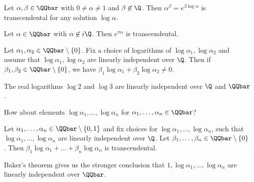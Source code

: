 \begin{thmn} 
	Let \( \alpha, \beta \in \QQbar \) with \( 0 \neq \alpha \neq 1 \) and \( \beta \not\in \Q \).
	Then \( \alpha^\beta = e^{\beta \log \alpha} \) is transcendental for any solution \( \log \alpha \).
\end{thmn}

\begin{cor}
	Let \( \alpha \in \QQbar \) with \( \alpha \not\in i\Q \).
	Then \( e^{\pi\alpha} \) is transcendental.
\end{cor}

\begin{cor}
	Let \( \alpha_1, \alpha_2 \in \QQbar \setminus \{0\} \).
	Fix a choice of logarithms of \( \log \alpha_1, \log\alpha_2 \) and assume that \( \log \alpha_1, \log\alpha_2 \) are linearly independent over \( \Q \).
	Then if \( \beta_1, \beta_2 \in \QQbar \setminus \{0\} \), we have \( \beta_1 \log\alpha_1 + \beta_2 \log\alpha_2 \neq 0 \).
\end{cor}

\begin{exmp*}
	The real logarithms \( \log 2 \) and \( \log 3 \) are linearly independent over \( \Q \) and \( \QQbar \).
\end{exmp*}

\begin{frage*}
	How about elements \( \log \alpha_1, \dotsc, \log\alpha_n \) for \( \alpha_1,\dotsc,\alpha_n \in \QQbar \)?
\end{frage*}

\begin{thmn}[Baker, 1965] 
	Let \( \alpha_1, \dotsc, \alpha_n \in \QQbar \setminus \{0,1\} \) and fix choices for \( \log\alpha_1, \dotsc, \log\alpha_n \), such that \( \log\alpha_1, \dotsc, \log\alpha_n \) are linearly independent over \( \Q \).
	Let \( \beta_1, \dotsc, \beta_n \in \QQbar \setminus \{0\} \).
	Then \( \beta_1 \log\alpha_1 + \dots + \beta_n \log\alpha_n \) is transcendental.
\end{thmn}

\begin{rem*}
	Baker's theorem gives us the stronger conclusion that \( 1, \log\alpha_1, \dotsc, \log\alpha_n \) are linearly independent over \( \QQbar \).
\end{rem*}

